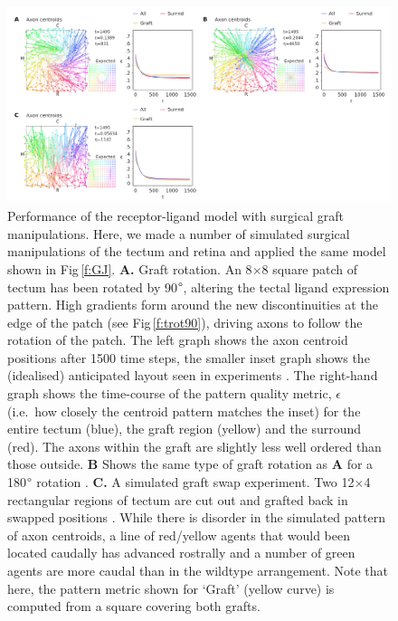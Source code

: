 \documentclass[9pt]{elife} %
\begin{document}
\begin{figure}
\begin{fullwidth}
\includegraphics[width=0.95\linewidth]{./images/fig_GJ_surgical_grafts.png}
\caption{Performance of the receptor-ligand model with surgical graft manipulations. Here, we made a number of simulated surgical manipulations of the tectum and retina and applied the same model shown in Fig\,\ref{f:GJ}. \textbf{A.} Graft rotation. An 8$\times$8 square patch of tectum has been rotated by 90$\degree$, altering the tectal ligand expression pattern. High gradients form around the new discontinuities at the edge of the patch (see Fig\,\ref{f:trot90}), driving axons to follow the rotation of the patch. The left graph shows the axon centroid positions after 1500 time steps, the smaller inset graph shows the (idealised) anticipated layout seen in experiments \citep{levine_deployment_1974}. The right-hand graph shows the time-course of the pattern quality metric, $\epsilon$ (i.e.~how closely the centroid pattern matches the inset) for the entire tectum (blue), the graft region (yellow) and the surround (red). The axons within the graft are slightly less well ordered than those outside. \textbf{B} Shows the same type of graft rotation as \textbf{A} for a 180$\degree$ rotation \citep{yoon_retention_1973}. \textbf{C.} A simulated graft swap experiment. Two 12$\times$4 rectangular regions of tectum are cut out and grafted back in swapped positions \citep{hope_arrow_1976,gaze_visuotectal_1983}. While there is disorder in the simulated pattern of axon centroids, a line of red/yellow agents that would been located caudally has advanced rostrally and a number of green agents are more caudal than in the wildtype arrangement. Note that here, the pattern metric shown for `Graft' (yellow curve) is computed from a square covering both grafts.}
\label{f:GJsurg_grafts}
\end{fullwidth}
\end{figure}
\end{document}
